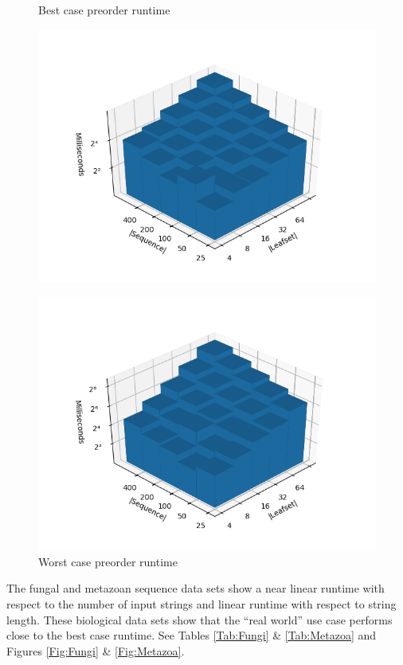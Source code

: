 \documentclass[11pt]{article}
\begin{document}
\begin{figure}[h]
\begin{minipage}{0.49\textwidth}
\centering
\caption{Best case preorder runtime}
\label{Fig:Best}
\includegraphics[width=1.05\textwidth]{pathological-12-preorder.png}
\end{minipage}
\hfill
\begin{minipage}{0.49\textwidth}
\centering
\caption{Worst case preorder runtime}
\label{Fig:Worst}
\includegraphics[width=1.05\textwidth]{pathological-31-preorder.png}
\end{minipage}
\end{figure}

The fungal and metazoan sequence data sets show a near linear runtime with respect to the number of input strings and linear runtime with respect to string length. 
These biological data sets show that the ``real world'' use case performs close to the best case runtime.
See Tables \ref{Tab:Fungi} \& \ref{Tab:Metazoa} and Figures \ref{Fig:Fungi} \& \ref{Fig:Metazoa}.
\end{document}
